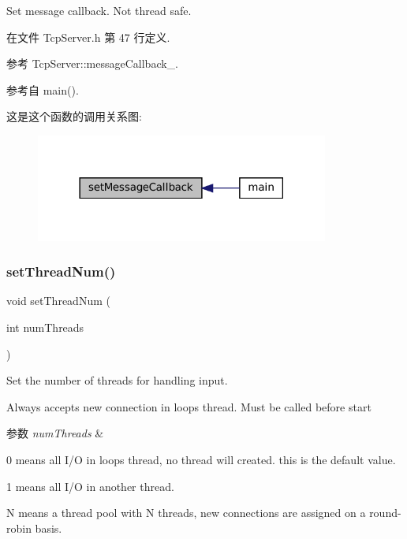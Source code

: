 Set message callback. Not thread safe. 

在文件 Tcp\+Server.\+h 第 47 行定义.



参考 Tcp\+Server\+::message\+Callback\+\_\+.



参考自 main().

这是这个函数的调用关系图\+:
\nopagebreak
\begin{figure}[H]
\begin{center}
\leavevmode
\includegraphics[width=273pt]{classmuduo_1_1TcpServer_a0a67f11f92b4cdc6f6c66b861f81cb08_icgraph}
\end{center}
\end{figure}
\mbox{\label{classmuduo_1_1TcpServer_a83bb28d139df96ba9fc449b4643f2c36}} 
\subsubsection{\texorpdfstring{set\+Thread\+Num()}{setThreadNum()}}
{\footnotesize\ttfamily void set\+Thread\+Num (\begin{DoxyParamCaption}\item[{int}]{num\+Threads }\end{DoxyParamCaption})}

Set the number of threads for handling input.

Always accepts new connection in loop\textquotesingle{}s thread. Must be called before {\ttfamily start} 
\begin{DoxyParams}{参数}
{\em num\+Threads} & 
\begin{DoxyItemize}
\item 0 means all I/O in loop\textquotesingle{}s thread, no thread will created. this is the default value.
\item 1 means all I/O in another thread.
\item N means a thread pool with N threads, new connections are assigned on a round-\/robin basis. 
\end{DoxyItemize}\\
\hline
\end{DoxyParams}


